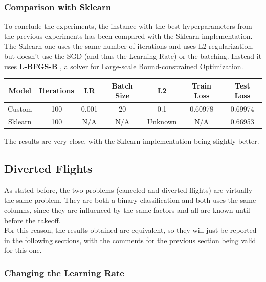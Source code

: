 \documentclass[
	letterpaper, %
	10pt, %
]{class}
\begin{document}
\subsubsection{Comparison with Sklearn}

To conclude the experiments, the instance with the best hyperparameters from the previous experiments has been compared with the Sklearn implementation.\\

The Sklearn one uses the same number of iterations and uses L2 regularization, but doesn't use the SGD (and thus the Learning Rate) or the batching.
Instead it uses \textbf{L-BFGS-B} \cite{lbfgsb}, a solver for Large-scale Bound-constrained Optimization.

\begin{center}
    \begin{tabular}{ |c|c|c|c|c|c|c| }
        \hline
        Model   & Iterations & LR    & Batch Size & L2      & Train Loss & Test Loss \\
        \hline
        Custom  & 100        & 0.001 & 20         & 0.1     & 0.60978    & 0.69974   \\
        Sklearn & 100        & N/A   & N/A        & Unknown & N/A        & 0.66953   \\
        \hline
    \end{tabular}
\end{center}

The results are very close, with the Sklearn implementation being slightly better.

\subsection{Diverted Flights}

As stated before, the two problems (canceled and diverted flights) are virtually the same problem. They are both a binary classification and both uses the same columns, since they are influenced by the same factors and all are known until before the takeoff.\\

For this reason, the results obtained are equivalent, so they will just be reported in the following sections, with the comments for the previous section being valid for this one.

\subsubsection{Changing the Learning Rate}
\end{document}
